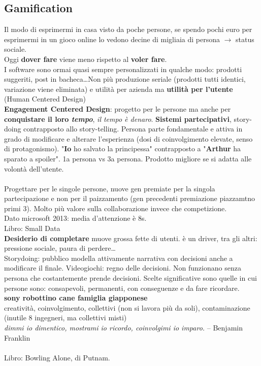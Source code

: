 \documentclass[10pt]{article}
\begin{document}
\subsection{Gamification}
Il modo di esprimermi in casa visto da poche persone, se spendo pochi euro per esprimermi in un gioco online lo vedono decine di migliaia di persona $\rightarrow$ status sociale.\\
Oggi \textbf{dover fare} viene meno rispetto al \textbf{voler fare}.\\
I software sono ormai quasi sempre personalizzati in qualche modo: prodotti suggeriti, post in bacheca\ldots Non più produzione seriale (prodotti tutti identici, variazione viene eliminata) e utilità per azienda ma \textbf{utilità per l'utente} (Human Centered Design)\\
\textbf{Engagement Centered Design}: progetto per le persone ma anche per \textbf{conquistare il loro \textit{tempo}}, \textit{il tempo è denaro}. \textbf{Sistemi partecipativi}, story-doing contrapposto allo story-telling. Persona parte fondamentale e attiva in grado di modificare e alterare l'esperienza (dosi di coinvolgimento elevate, senso di protagonismo). "\textbf{Io} ho salvato la principessa" contrapposto a "\textbf{Arthur} ha sparato a spoiler". 1a persona vs 3a persona. Prodotto migliore se si adatta alle volontà dell'utente.\\\\
Progettare per le singole persone, nuove gen premiate per la singola partecipazione e non per il paizzamento (gen precedenti premiazione piazzamtno primi 3). Molto più valore sulla collaborazione invece che competizione.\\
Dato microsoft 2013: media d'attenzione è 8s.\\
Libro: Small Data\\
\textbf{Desiderio di completare} muove grossa fette di utenti. è un driver, tra gli altri: pressione sociale, paura di perdere\ldots\\
Storydoing: pubblico modella attivamente narrativa con decisioni anche a modificare il finale. Videogiochi: regno delle decisioni. Non funzionano senza persona che costantemente prende decisioni. Scelte significative sono quelle in cui persone sono: consapevoli, permanenti, con conseguenze e da fare ricordare.\\
\textbf{sony robottino cane famiglia giapponese}\\
creatività, coinvolgimento, collettivi (non si lavora più da soli), contaminazione (inutile 8 ingegneri, ma collettivi misti)\\
\textit{dimmi io dimentico, mostrami io ricordo, coinvolgimi io imparo.} -- Benjamin Franklin\\\\
Libro: Bowling Alone, di Putnam.
\pagebreak
\end{document}
